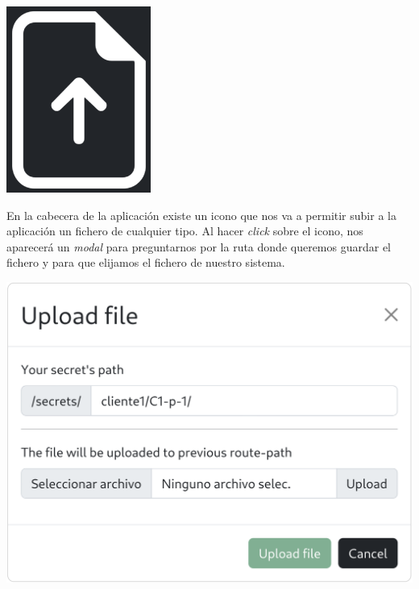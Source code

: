 \documentclass{\ClassPath/viu-tfm-template}
\begin{document}
{
    \begin{minipage}{0.1\linewidth}
        \includegraphics[width=\linewidth]{img/upload.png}
    \end{minipage}
    \hspace{0.5cm}
    \begin{minipage}{0.9\linewidth}
        En la cabecera de la aplicación existe un icono que nos va a permitir subir a la aplicación un fichero de cualquier tipo. Al hacer \textit{click} sobre el icono, nos aparecerá un \textit{modal} para preguntarnos por la ruta donde queremos guardar el fichero y para que elijamos el fichero de nuestro sistema.
    \end{minipage}
}

\begin{center}
    \includegraphics[width=0.7\linewidth]{img/upload_modal.png}
\end{center}
\end{document}
